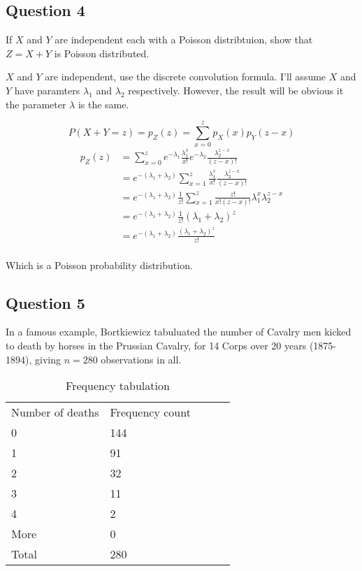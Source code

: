 \documentclass{tufte-book}
\theoremstyle{mytheoremstyle}
\theoremstyle{mylemstyle}
\theoremstyle{mydefstyle}
\begin{document}
\subsection{Question 4}
If $X$ and $Y$ are independent each with a Poisson distribtuion, show that $Z=X+Y$ is Poisson distributed.

 $X$ and $Y$ are independent, use the discrete convolution formula.  I'll assume $X$ and $Y$ have paramters $\lambda_1$ and $\lambda_2$ respectively.  However, the result will be obvious it the parameter $\lambda$ is the same.

\[ P(X+Y=z) = p_Z(z) = \sum_{x=0}^z p_X(x) p_Y(z-x) \]
\begin{align*}
p_Z(z) &= \sum_{x=0}^z e^{-\lambda_1} \frac{\lambda_1^x}{x!} e^{-\lambda_2} \frac{\lambda_2^{z-x}}{(z-x)!}\\
&= e^{-(\lambda_1 + \lambda_2)} \sum_{x=1}^z \frac{\lambda_1^x}{x!} \frac{\lambda_2^{z-x}}{(z-x)!}\\
&= e^{-(\lambda_1 + \lambda_2)}\frac{1}{z!} \sum_{x=1}^z \frac{z!}{x!(z-x)!} \lambda_1^x \lambda_2^{z-x}\\
&= e^{-(\lambda_1 + \lambda_2)}\frac{1}{z!} (\lambda_1+\lambda_2)^z\\
&= e^{-(\lambda_1 + \lambda_2)}\frac{(\lambda_1+\lambda_2)^z}{z!}\\
\end{align*}

Which is a Poisson probability distribution.

\subsection{Question 5}
In a famous example, Bortkiewicz tabuluated the number of Cavalry men kicked to death by horses in the Prussian Cavalry, for 14 Corps over 20 years (1875-1894), giving $n=280$ observations in all.

\begin{table}
\centering
\caption{Frequency tabulation}
\label{freq-tab}
\begin{tabular}{|l|l|lll}
\cline{1-2}
Number of deaths & Frequency count \\ \cline{1-2}
0                & 144             \\ \cline{1-2}
1                & 91              \\ \cline{1-2}
2                & 32              \\ \cline{1-2}
3                & 11              \\ \cline{1-2}
4                & 2               \\ \cline{1-2}
More             & 0               \\ \cline{1-2}
Total            & 280             \\ \cline{1-2}
\end{tabular}
\end{table}
\end{document}
